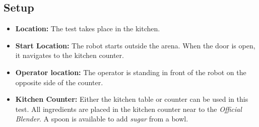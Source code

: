 \subsection*{Setup}
\begin{itemize}[nosep]
	\item \textbf{Location:} The test takes place in the kitchen.

	\item \textbf{Start Location:} The robot starts outside the arena.
	When the door is open, it navigates to the kitchen counter.

	\item \textbf{Operator location:} The operator is standing in front of the robot on the opposite side of the counter.

	\item \textbf{Kitchen Counter:} Either the kitchen table or counter can be used in this test.
	All ingredients are placed in the kitchen counter near to the \emph{Official Blender}.
	A spoon is available to add \emph{sugar} from a bowl.

\end{itemize}

